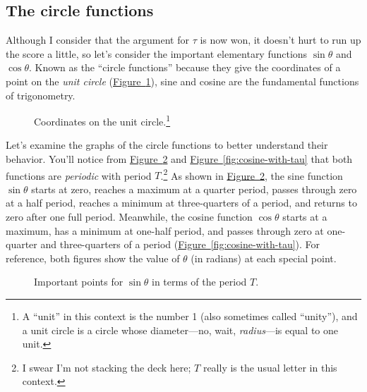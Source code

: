 \documentclass{article}
\begin{document}
  \subsection{The circle functions} %
  \label{sec:the_circle_functions}

Although I consider that the argument for $\tau$ is now won, it doesn't hurt to run up the score a little, so let's consider the important elementary functions $\sin\theta$ and $\cos\theta$. Known as the ``circle functions''  because they give the coordinates of a point on the \emph{unit circle} (\hyperref[fig:circle-functions]{Figure~}\ref{fig:circle-functions}), sine and cosine are the fundamental functions of trigonometry.

\begin{figure}
\begin{center}
\end{center}
\caption{Coordinates on the unit circle.\footnote{A ``unit'' in this context is the number 1 (also sometimes called ``unity''), and a unit circle is a circle whose diameter---no, wait, \emph{radius}---is equal to one unit.}\label{fig:circle-functions}}
\end{figure}

Let's examine the graphs of the circle functions to better understand their behavior. You'll notice from \hyperref[fig:sine-with-tau]{Figure~}\ref{fig:sine-with-tau} and \hyperref[fig:cosine-with-tau]{Figure~}\ref{fig:cosine-with-tau} that both functions are \emph{periodic} with period $T$.\footnote{I swear I'm not stacking the deck here; $T$ really is the usual letter in this context.} As shown in \hyperref[fig:sine-with-tau]{Figure~}\ref{fig:sine-with-tau}, the sine function $\sin\theta$ starts at zero, reaches a maximum at a quarter period, passes through zero at a half period, reaches a minimum at three-quarters of a period, and returns to zero after one full period. Meanwhile, the cosine function $\cos\theta$ starts at a maximum, has a minimum at one-half period, and passes through zero at one-quarter and three-quarters of a period  (\hyperref[fig:cosine-with-tau]{Figure~}\ref{fig:cosine-with-tau}). For reference, both figures show the value of $\theta$ (in radians) at each special point.

\begin{figure}
\begin{center}
\end{center}
\caption{Important points for $\sin\theta$ in terms of the period $T$.\label{fig:sine-with-tau}}
\end{figure}
\end{document}
